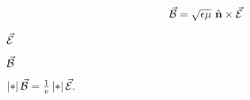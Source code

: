 \documentclass[10pt]{book}
\begin{document}
\begin{mdSnippets}
\begin{mdDisplaySnippet}[ec088461d9c40db16baae02ac4b5ed87]%
\[%
\vBB = \sqrt{\epsilon\mu}\ \hat{\vb{n}} \times \va{\mathcal{E}}
\]%
\end{mdDisplaySnippet}%
\begin{mdInlineSnippet}%
$\vec{\mathcal{E}}$\end{mdInlineSnippet}%
\begin{mdInlineSnippet}[9753da3b8740fe5fb11142e0a6613de8]%
$\vec{\mathcal{B}}$\end{mdInlineSnippet}%
\begin{mdInlineSnippet}[b9ecba80b09dd2783868e27d65c93a93]%
$\left\vert *\right\vert{\vec{\mathcal{B}}} = \frac{1}{v} \left\vert *\right\vert{\vec{\mathcal{E}}}.$\end{mdInlineSnippet}%

\end{mdSnippets}
\end{document}

